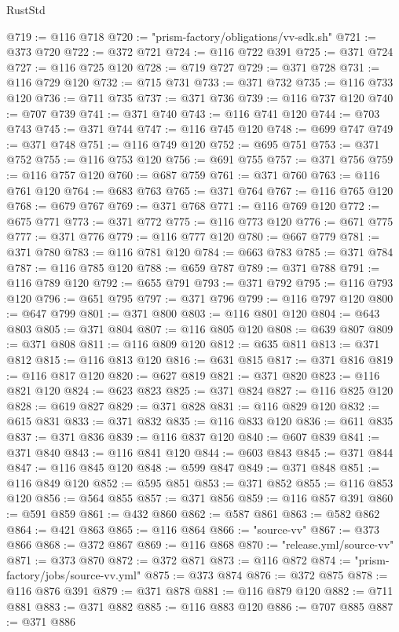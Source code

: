 \begin{lexlean}{RustStd}
\begin{coremodule}
@719 := @116 @718
@720 := "prism-factory/obligations/vv-sdk.sh"
@721 := @373 @720
@722 := @372 @721
@724 := @116 @722 @391
@725 := @371 @724
@727 := @116 @725 @120
@728 := @719 @727
@729 := @371 @728
@731 := @116 @729 @120
@732 := @715 @731
@733 := @371 @732
@735 := @116 @733 @120
@736 := @711 @735
@737 := @371 @736
@739 := @116 @737 @120
@740 := @707 @739
@741 := @371 @740
@743 := @116 @741 @120
@744 := @703 @743
@745 := @371 @744
@747 := @116 @745 @120
@748 := @699 @747
@749 := @371 @748
@751 := @116 @749 @120
@752 := @695 @751
@753 := @371 @752
@755 := @116 @753 @120
@756 := @691 @755
@757 := @371 @756
@759 := @116 @757 @120
@760 := @687 @759
@761 := @371 @760
@763 := @116 @761 @120
@764 := @683 @763
@765 := @371 @764
@767 := @116 @765 @120
@768 := @679 @767
@769 := @371 @768
@771 := @116 @769 @120
@772 := @675 @771
@773 := @371 @772
@775 := @116 @773 @120
@776 := @671 @775
@777 := @371 @776
@779 := @116 @777 @120
@780 := @667 @779
@781 := @371 @780
@783 := @116 @781 @120
@784 := @663 @783
@785 := @371 @784
@787 := @116 @785 @120
@788 := @659 @787
@789 := @371 @788
@791 := @116 @789 @120
@792 := @655 @791
@793 := @371 @792
@795 := @116 @793 @120
@796 := @651 @795
@797 := @371 @796
@799 := @116 @797 @120
@800 := @647 @799
@801 := @371 @800
@803 := @116 @801 @120
@804 := @643 @803
@805 := @371 @804
@807 := @116 @805 @120
@808 := @639 @807
@809 := @371 @808
@811 := @116 @809 @120
@812 := @635 @811
@813 := @371 @812
@815 := @116 @813 @120
@816 := @631 @815
@817 := @371 @816
@819 := @116 @817 @120
@820 := @627 @819
@821 := @371 @820
@823 := @116 @821 @120
@824 := @623 @823
@825 := @371 @824
@827 := @116 @825 @120
@828 := @619 @827
@829 := @371 @828
@831 := @116 @829 @120
@832 := @615 @831
@833 := @371 @832
@835 := @116 @833 @120
@836 := @611 @835
@837 := @371 @836
@839 := @116 @837 @120
@840 := @607 @839
@841 := @371 @840
@843 := @116 @841 @120
@844 := @603 @843
@845 := @371 @844
@847 := @116 @845 @120
@848 := @599 @847
@849 := @371 @848
@851 := @116 @849 @120
@852 := @595 @851
@853 := @371 @852
@855 := @116 @853 @120
@856 := @564 @855
@857 := @371 @856
@859 := @116 @857 @391
@860 := @591 @859
@861 := @432 @860
@862 := @587 @861
@863 := @582 @862
@864 := @421 @863
@865 := @116 @864
@866 := "source-vv"
@867 := @373 @866
@868 := @372 @867
@869 := @116 @868
@870 := "release.yml/source-vv"
@871 := @373 @870
@872 := @372 @871
@873 := @116 @872
@874 := "prism-factory/jobs/source-vv.yml"
@875 := @373 @874
@876 := @372 @875
@878 := @116 @876 @391
@879 := @371 @878
@881 := @116 @879 @120
@882 := @711 @881
@883 := @371 @882
@885 := @116 @883 @120
@886 := @707 @885
@887 := @371 @886

\end{coremodule}
\end{lexlean}
